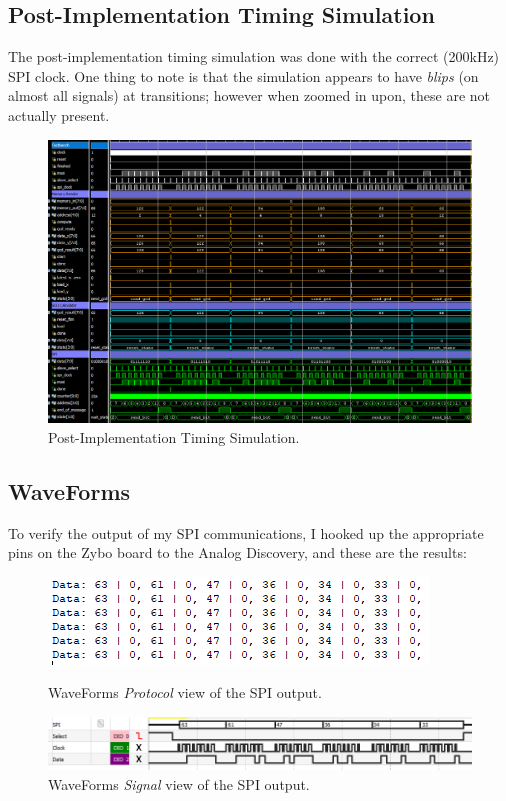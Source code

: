 \documentclass[a4paper, 12pt]{article}
\begin{document}
\begin{landscape}
\subsection{Post-Implementation Timing Simulation}
The post-implementation timing simulation was done with the correct (200kHz) SPI clock. One thing to note is that the simulation appears to have \textit{blips} (on almost all signals) at transitions; however when zoomed in upon, these are not actually present.

\begin{figure}[H]
\centering
\includegraphics[width=0.85\paperheight, keepaspectratio=true]{Sources/Post-Impl-All-Signals-Sim.PNG}
\caption{Post-Implementation Timing Simulation.}
\label{fig:post-impl-sim}
\end{figure}

\subsection{WaveForms}
To verify the output of my SPI communications, I hooked up the appropriate pins on the Zybo board to the Analog Discovery, and these are the results:

\begin{figure}[H]
\centering
\includegraphics[width=0.55\paperheight, keepaspectratio=true]{Sources/waveforms-protocol.PNG}
\caption{WaveForms \textit{Protocol} view of the SPI output.}
\label{fig:waveforms-protocol}
\includegraphics[width=0.85\paperheight, keepaspectratio=true]{Sources/waveforms-signals.PNG}
\caption{WaveForms \textit{Signal} view of the SPI output.}
\label{fig:waveforms-signal}
\end{figure}


\end{landscape}
\end{document}
